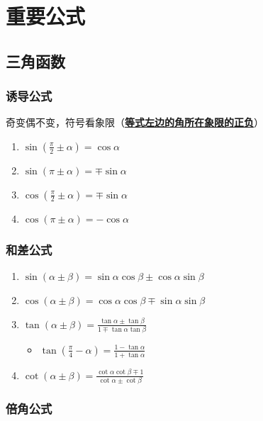 \documentclass[../book.tex]{subfiles}
\begin{document}
\section{重要公式}

\subsection{三角函数}

\subsubsection{诱导公式}

奇变偶不变，符号看象限（\textbf{\underline{等式左边的角所在象限的正负}}）

\begin{enumerate}
    \item $\sin (\displaystyle\frac{\pi}{2} \pm \alpha) = \cos \alpha$
    \item $\sin (\pi \pm \alpha) = \mp \sin \alpha$
    \item $\cos (\displaystyle\frac{\pi}{2} \pm \alpha) = \mp \sin \alpha$
    \item $\cos (\pi \pm \alpha) = -\cos \alpha$
\end{enumerate}

\subsubsection{和差公式}

\begin{enumerate}
    \item $\sin (\alpha \pm \beta) = \sin \alpha \cos \beta \pm \cos \alpha \sin \beta$
    \item $\cos (\alpha \pm \beta) = \cos \alpha \cos \beta \mp \sin \alpha \sin \beta$
    \item $\tan (\alpha \pm \beta) = \displaystyle\frac{\tan \alpha \pm \tan \beta}{1 \mp \tan \alpha \tan \beta}$
    \begin{itemize}
        \item $\tan (\displaystyle\frac{\pi}{4} - \alpha) = \displaystyle\frac{1 - \tan \alpha}{1 + \tan \alpha}$
    \end{itemize}
    \item $\cot (\alpha \pm \beta) = \displaystyle\frac{\cot \alpha \cot \beta \mp 1}{\cot \alpha \pm \cot \beta}$
\end{enumerate}

\subsubsection{倍角公式}
\end{document}
